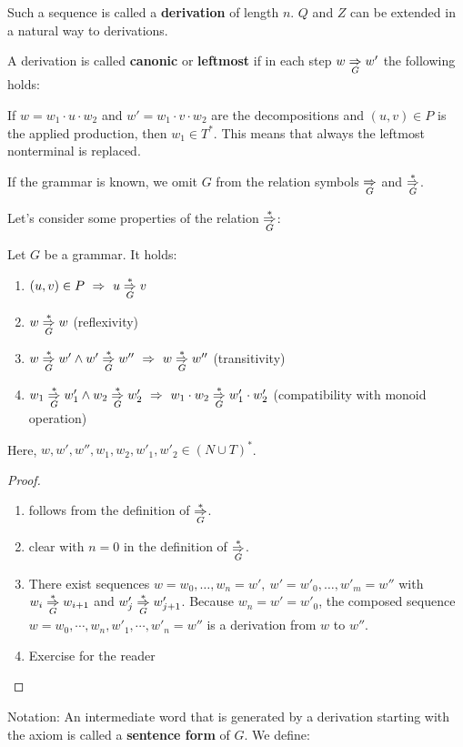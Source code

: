 Such a sequence is called a {\bf derivation} of length $n$. $Q$ and $Z$ can be
extended in a natural way to derivations.

A derivation is called {\bf canonic} or {\bf leftmost} if in each step $w
\underset{G}{\Rightarrow} w'$ the following holds:

If $w = w_1 \cdot u \cdot w_2$ and $w' = w_1 \cdot v \cdot w_2$ are the
decompositions and $(u, v) \in P$ is the applied production, then $w_1 \in T^*$.
This means that always the leftmost nonterminal is replaced.

If the grammar is known, we omit $G$ from the relation
symbols $\underset{G}{\Rightarrow}$ and $\underset{G}{\overset{*}{\Rightarrow}}$. 

Let's consider some properties of the
relation $\underset{G}{\overset{*}{\Rightarrow}}$:

\begin{lemma}
Let $G$ be a grammar. It holds:
\begin{enumerate}
  \item $(u, v) \in P \ \Rightarrow\ u \underset{G}{\overset{*}{\Rightarrow}} v$
  \item $w \underset{G}{\overset{*}{\Rightarrow}} w$ (reflexivity)
  \item $w \underset{G}{\overset{*}{\Rightarrow}} w' \wedge w' \underset{G}{\overset{*}{\Rightarrow}} w'' \ \Rightarrow\ w \underset{G}{\overset{*}{\Rightarrow}}
  w''$ (transitivity)
  \item $w_1 \underset{G}{\overset{*}{\Rightarrow}} w'_1 \wedge w_2 \underset{G}{\overset{*}{\Rightarrow}} w'_2\ \Rightarrow\ w_1
  \cdot w_2 \underset{G}{\overset{*}{\Rightarrow}} w'_1 \cdot w'_2$ (compatibility with monoid operation)
\end{enumerate}
Here, $w, w', w'', w_1, w_2, w'_1, w'_2 \in (N \cup T)^*$.
\end{lemma}

\begin{proof}\ 

\begin{enumerate}
  \item follows from the definition of $\underset{G}{\overset{*}{\Rightarrow}}$.
  \item clear with $n = 0$ in the definition of $\underset{G}{\overset{*}{\Rightarrow}}$.
  \item There exist sequences $w = w_0, \ldots, w_n = w',\ w' = w'_0, \ldots,
  w'_m = w''$ with $w_i \underset{G}{\overset{*}{\Rightarrow}} w_{i+1}$ and $w'_j \underset{G}{\overset{*}{\Rightarrow}} w'_{j+1}$.
  Because $w_n = w' = w'_0$, the composed sequence $w = w_0, \cdots, w_n, w'_1,
  \cdots, w'_n = w''$ is a derivation from $w$ to $w''$.
  \item Exercise for the reader
\end{enumerate}
\end{proof}

Notation: An intermediate word that is generated by a derivation starting with
the axiom is called a {\bf sentence form} of $G$. We define:

